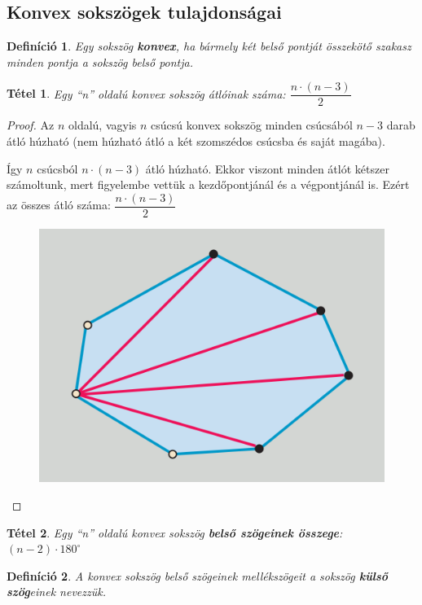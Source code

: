 \documentclass[12pt,a4paper]{article}
\newtheorem{theorem}{Tétel} [section]
\newtheorem{definition}{Definíció} [section]
\begin{document}
\subsection{Konvex sokszögek tulajdonságai}
\begin{definition}
Egy sokszög \textbf{konvex}, ha bármely két belső pontját összekötő szakasz minden pontja a sokszög belső pontja.
\end{definition}
\begin{theorem}
Egy ``n'' oldalú konvex sokszög átlóinak száma: $\dfrac{n\cdot (n-3)}{2}$
\end{theorem}
\begin{proof}
Az $n$ oldalú, vagyis $n$ csúcsú konvex sokszög minden csúcsából $n - 3$ darab átló húzható (nem húzható átló a két szomszédos csúcsba és saját magába). 

Így $n$ csúcsból $n \cdot (n - 3)$ átló húzható. Ekkor viszont minden átlót kétszer számoltunk, mert figyelembe vettük a kezdőpontjánál és a végpontjánál is. Ezért az összes átló száma: $\dfrac{n\cdot (n-3)}{2}$
\begin{figure}[h]
\centering
\includegraphics[scale=0.3]{geometry/sokszog_atlo}
\end{figure}

\end{proof}

\begin{theorem}
Egy ``n'' oldalú konvex sokszög \textbf{belső szögeinek összege}: $(n-2)\cdot 180^\circ$
\end{theorem}

\begin{definition}
A konvex sokszög belső szögeinek mellékszögeit a sokszög \textbf{külső szög}einek nevezzük.
\end{definition}
\end{document}
